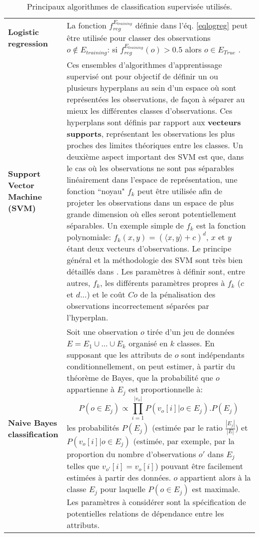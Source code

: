 \begin{longtable}{ @{\hspace{-2.2cm}} >{\bfseries}p{}|>{\small}p{\textwidth}}
	\caption[Algorithmes de classification utilisés]{Principaux algorithmes de classification supervisée utilisés.}\label{tabalgoclassif}\\
	Logistic \mbox{regression} & La fonction $f_{reg}^{E_{training}}$ définie dans l'éq. \ref{eqlogreg} peut être utilisée pour classer des observations $o \notin E_{training}$: si  $f_{reg}^{E_{training}}(o)>0.5$ alors $o \in E_{True}$ \citep{hosmer2013applied}.
	\\[0.6cm]
	Support \mbox{Vector} \mbox{Machine} (SVM) & \citep{cortes1995support} Ces ensembles d'algorithmes d'apprentissage supervisé ont pour objectif de définir un ou plusieurs hyperplans au sein d'un espace où sont représentées les observations, de façon à séparer au mieux les différentes classes d'observations. Ces hyperplans sont définis par rapport aux \textbf{vecteurs supports}, représentant les observations les plus proches des limites théoriques entre les classes. Un deuxième aspect important des SVM est que, dans le cas où les observations ne sont pas séparables linéairement dans l'espace de représentation, une fonction ``noyau" $f_{k}$ peut être utilisée afin de projeter les observations dans un espace de plus grande dimension où elles seront potentiellement séparables. Un exemple simple de $f_{k}$ est la fonction polynomiale: $f_{k}(x,y)=(\langle x,y\rangle+c)^{d}$, $x$ et $y$ étant deux vecteurs d'observations.  Le principe général et la méthodologie des SVM sont très bien détaillés dans \citep{hamel2011knowledge}. Les paramètres à définir sont, entre autres, $f_{k}$, les différents paramètres propres à $f_{k}$ ($c$ et $d$...) et le coût $Co$ de la pénalisation des observations incorrectement séparées par l'hyperplan.
	\\[0.6cm]
	Naive Bayes \mbox{classification} & \cite[p.219]{Larose2006} Soit une observation $o$ tirée d'un jeu de données $E=E_{1} \cup ... \cup E_{k}$ organisé en $k$ classes. En supposant que les attributs de $o$ sont indépendants conditionnellement, on peut estimer, à partir du théorème de Bayes, que la probabilité que $o$ appartienne à $E_{j}$ est proportionnelle à: 
	  \begin{equation}      
      	P(o \in E_{j}) \propto \prod_{i=1}^{|v_{o}|}P(v_{o}[i]|o \in E_{j}).P(E_{j}) 
      \end{equation}
      les probabilités $P(E_{j})$ (estimée par le ratio $\frac{|E_{j}|}{|E|}$)  et $P(v_{o}[i]|o \in E_{j})$ (estimée, par exemple, par la proportion du nombre d'observations $o'$ dans $E_{j}$ telles que $v_{o'}[i]=v_{o}[i]$) pouvant être facilement estimées à partir des données. $o$ appartient alors à la classe $E_{j}$ pour laquelle $P(o \in E_{j})$ est maximale. Les paramètres à considérer sont la spécification de potentielles relations de dépendance entre les attributs.

\end{longtable}
